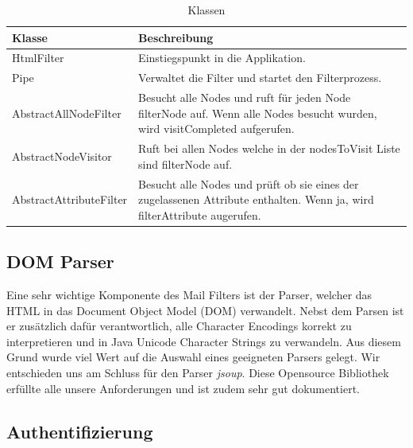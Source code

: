 \begin{table}[H]
\begin{center}
\begin{tabular}{l p{10.5cm} }
\hline
\textbf{Klasse} & \textbf{Beschreibung} \\ \hline \hline
HtmlFilter & Einstiegspunkt in die Applikation. \\
Pipe & Verwaltet die Filter und startet den Filterprozess. \\
AbstractAllNodeFilter & Besucht alle Nodes und ruft für jeden Node filterNode auf. Wenn alle Nodes besucht wurden, wird visitCompleted aufgerufen. \\
AbstractNodeVisitor & Ruft bei allen Nodes welche in der nodesToVisit Liste sind filterNode auf. \\
AbstractAttributeFilter & Besucht alle Nodes und prüft ob sie eines der zugelassenen Attribute enthalten. Wenn ja, wird filterAttribute augerufen. \\
\hline \hline
\end{tabular}
\caption{Klassen}
\label{tab:class}
\end{center}
\end{table}

\subsection{DOM Parser}

Eine sehr wichtige Komponente des Mail Filters ist der Parser, welcher das HTML in das Document
Object Model (DOM) verwandelt. Nebst dem Parsen ist er zusätzlich dafür verantwortlich, alle Character
Encodings korrekt zu interpretieren und in Java Unicode Character Strings zu verwandeln. Aus diesem 
Grund wurde viel Wert auf die Auswahl eines geeigneten Parsers gelegt. Wir entschieden uns am Schluss 
für den Parser \textit{jsoup}\cite{DOM:JSOUP}. Diese Opensource Bibliothek erfüllte alle unsere 
Anforderungen und ist zudem sehr gut dokumentiert. 

\subsection{Authentifizierung}

